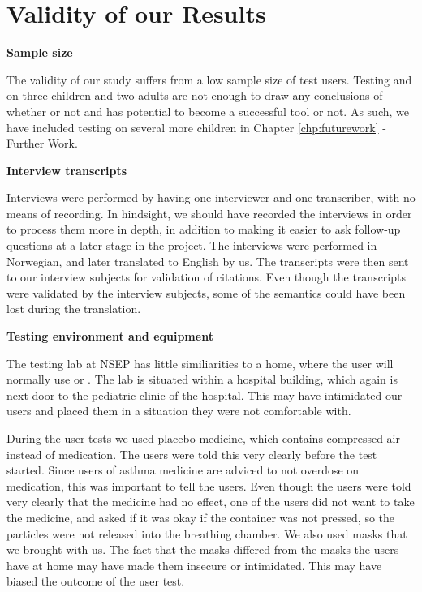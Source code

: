 \section{Validity of our Results}
\label{sec:validity}

\textbf{Sample size}

The validity of our study suffers from a low sample size of test users. Testing \ab{} and \app{} on three children and two adults are not enough to draw any conclusions of whether or not \app{} and \ab{} has potential to become a successful tool or not. As such, we have included testing on several more children in Chapter \ref{chp:futurework} - Further Work.    

\textbf{Interview transcripts}

Interviews were performed by having one interviewer and one transcriber, with no means of recording. In hindsight, we should have recorded the interviews in order to process them more in depth, in addition to making it easier to ask follow-up questions at a later stage in the project. The interviews were performed in Norwegian, and later translated to English by us. The transcripts were then sent to our interview subjects for validation of citations. Even though the transcripts were validated by the interview subjects, some of the semantics could have been lost during the translation. 


\textbf{Testing environment and equipment}

The testing lab at NSEP has little similiarities to a home, where the user will normally use \ab{} or \app{}. The lab is situated within a hospital building, which again is next door to the pediatric clinic of the hospital. This may have intimidated our users and placed them in a situation they were not comfortable with. 

During the user tests we used placebo medicine, which contains compressed air instead of medication. The users were told this very clearly before the test started. Since users of asthma medicine are adviced to not overdose on medication, this was important to tell the users. Even though the users were told very clearly that the medicine had no effect, one of the users did not want to take the medicine, and asked if it was okay if the container was not pressed, so the particles were not released into the breathing chamber. 
We also used masks that we brought with us. The fact that the masks differed from the masks the users have at home may have made them insecure or intimidated. This may have biased the outcome of the user test. 


